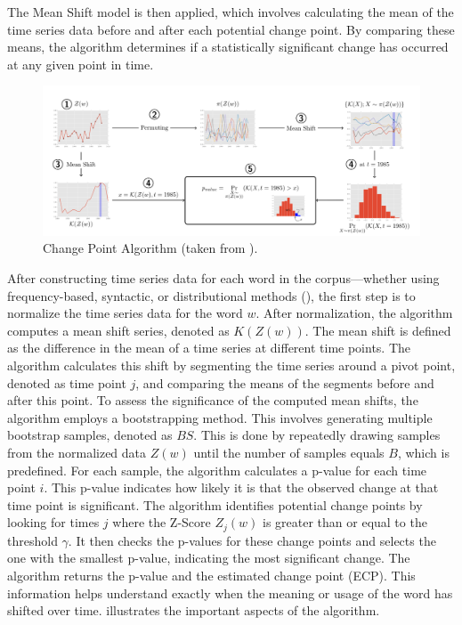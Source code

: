 The Mean Shift model is then applied, which involves calculating the mean of the time series data before and after each potential change point.
By comparing these means, the algorithm determines if a statistically significant change has occurred at any given point in time.

\begin{figure}[htb]
    \centering
    \vspace{-1em}
    \includegraphics[scale=0.17]{figures/changepoint}
    \vspace*{-0.5cm}
    \caption{Change Point Algorithm (taken from \cite{kulkarni2014statisticallysignificantdetectionlinguistic}).}
    \label{fig:kulkarni-changepoint}
\end{figure}

After constructing time series data for each word in the corpus—whether using frequency-based, syntactic, or distributional methods (), the first step is to normalize the time series data for the word $w$.
After normalization, the algorithm computes a mean shift series, denoted as $K(Z(w))$.
The mean shift is defined as the difference in the mean of a time series at different time points.
The algorithm calculates this shift by segmenting the time series around a pivot point, denoted as time point $j$, and comparing the means of the segments before and after this point.
To assess the significance of the computed mean shifts, the algorithm employs a bootstrapping method.
This involves generating multiple bootstrap samples, denoted as $BS$.
This is done by repeatedly drawing samples from the normalized data $Z(w)$ until the number of samples equals $B$, which is predefined.
For each sample, the algorithm calculates a p-value for each time point $i$.
This p-value indicates how likely it is that the observed change at that time point is significant.
The algorithm identifies potential change points by looking for times $j$ where the Z-Score $Z_j(w)$ is greater than or equal to the threshold $\gamma$.
It then checks the p-values for these change points and selects the one with the smallest p-value, indicating the most significant change.
The algorithm returns the p-value and the estimated change point (ECP).
This information helps understand exactly when the meaning or usage of the word has shifted over time.
 illustrates the important aspects of the algorithm.

